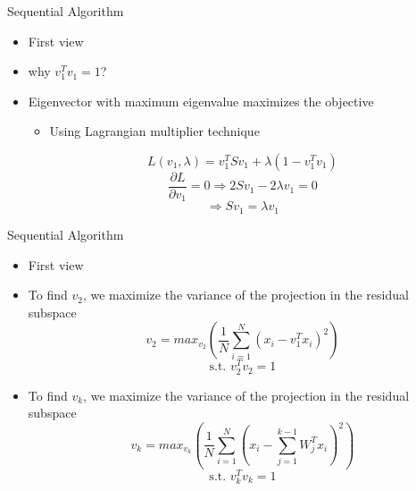 \documentclass[serif, aspectratio=169]{beamer}
\begin{document}
\begin{frame}{Sequential Algorithm}
    \begin{itemize}
        \item First view
        \item why $v_1^{T}{v_1} = 1$?
        \item Eigenvector with maximum eigenvalue maximizes the objective
        \begin{itemize}
            \item  Using Lagrangian multiplier technique
        \end{itemize}
        $$ L(v_1, \lambda) = v_1^T S v_1 + \lambda (1 - v_1^T v_1) $$
        $$ \frac{\partial L}{\partial v_1} = 0 \Rightarrow 2Sv_1 - 2\lambda v_1 = 0
 $$
        $$ \Rightarrow Sv_1 = \lambda v_1 $$
        
    \end{itemize}
\end{frame}

\begin{frame}{Sequential Algorithm}
    \begin{itemize}
        \item First view
        \item To find $v_2$, we maximize the variance of the projection in the residual subspace
$$
v_2 = max_{v_2} \left( \frac{1}{N} \sum_{i=1}^{N} \left( x_i - v_1^T x_i \right)^2 \right)
$$
$$ \text{s.t. } v_2^{T}{v_2}  = 1$$
          \item To find $v_k$, we maximize the variance of the projection in the residual subspace
$$
v_k = max_{v_k} \left( \frac{1}{N} \sum_{i=1}^{N} \left( x_i - \sum_{j=1}^{k-1} W_j^T x_i \right)^2 \right)
$$      
$$ \text{s.t. } v_k^{T}{v_k}  = 1$$
    \end{itemize}
\end{frame}
\end{document}
